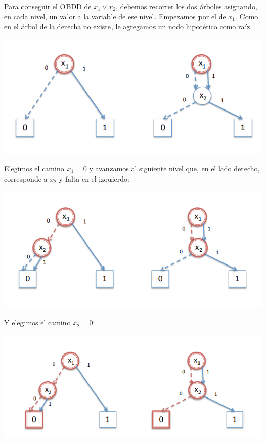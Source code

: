 Para conseguir el OBDD de $x_1\lor x_2$, debemos recorrer los dos árboles asignando, en cada nivel, un valor a la variable de ese nivel. Empezamos por el de $x_1$. Como en el árbol de la derecha no existe, le agregamos un nodo hipotético como raíz.
\begin{center}
\includegraphics[scale=0.35]{imagenes/compo-bdd2}
\end{center}

Elegimos el camino $x_1 = 0$ y avanzamos al siguiente nivel que, en el lado derecho, corresponde a $x_2$ y falta en el izquierdo:
\begin{center}
	\includegraphics[scale=0.35]{imagenes/compo-obdd3}
\end{center}

Y elegimos el camino $x_2 = 0$:

\begin{center}
	\includegraphics[scale=0.35]{imagenes/compo-robdd4}
\end{center}

